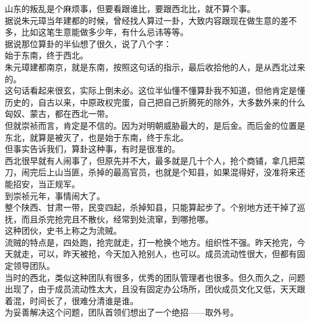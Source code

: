 	\begin{multicols}{\theparacolNo}
\fi
山东的叛乱是个麻烦事，但要看跟谁比，要跟西北比，就不算个事。\\

据说朱元璋当年建都的时候，曾经找人算过一卦，大致内容跟现在做生意的差不多，比如这笔生意能做多少年，有什么忌讳等等。\\

据说那位算卦的半仙想了很久，说了八个字：\\

始于东南，终于西北。\\

朱元璋建都南京，就是东南，按照这句话的指示，最后收拾他的人，是从西北过来的。\\

这句话看起来很玄，实际上倒未必。这位半仙懂不懂算卦我不知道，但他肯定是懂历史的，自古以来，中原政权完蛋，自己把自己折腾死的除外，大多数外来的什么匈奴、蒙古，都在西北一带。\\

但就崇祯而言，肯定是不信的。因为对明朝威胁最大的，是后金。而后金的位置是东北，就算是被灭了，也是始于东南，终于东北。\\

但事实告诉我们，算卦这种事，有时是很准的。\\

西北很早就有人闹事了，但原先并不大，最多就是几十个人，抢个商铺，拿几把菜刀，闹完后上山当匪，杀掉的最高官员，也就是个知县，如果混得好，没准将来还能招安，当正规军。\\

到崇祯元年，事情闹大了。\\

整个陕西、甘肃一带，民变四起，杀掉知县，只能算起步了。个别地方还干掉了巡抚，而且杀完抢完且不散伙，经常到处流窜，到哪抢哪。\\

这种团伙，史书上称之为流贼。\\

流贼的特点是，四处跑，抢完就走，打一枪换个地方。组织性不强。昨天抢完，今天就走，可以，昨天被抢，今天加入抢别人，也可以。成员流动性很大，但都有固定领导团队。\\

当时的西北，类似这种团队有很多，优秀的团队管理者也很多。但久而久之，问题出现了，由于成员流动性太大，且没有固定办公场所，团伙成员文化又低，天天跟着混，时间长了，很难分清谁是谁。\\

为妥善解决这个问题，团队首领们想出了一个绝招——取外号。\\


\end{multicols}
